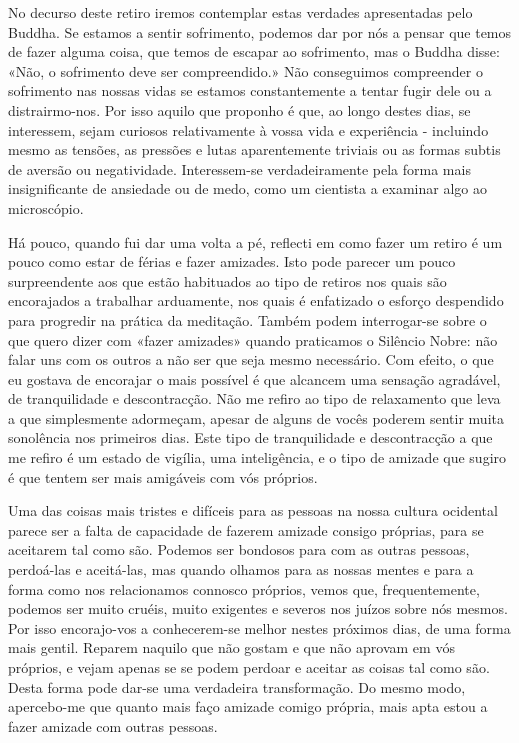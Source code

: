 No decurso deste retiro iremos contemplar estas verdades apresentadas
pelo Buddha. Se estamos a sentir sofrimento, podemos dar por nós a
pensar que temos de fazer alguma coisa, que temos de escapar ao
sofrimento, mas o Buddha disse: «Não, o sofrimento deve ser
compreendido.» Não conseguimos compreender o sofrimento nas nossas vidas
se estamos constantemente a tentar fugir dele ou a distrairmo-nos. Por
isso aquilo que proponho é que, ao longo destes dias, se interessem,
sejam curiosos relativamente à vossa vida e experiência - incluindo
mesmo as tensões, as pressões e lutas aparentemente triviais ou as
formas subtis de aversão ou negatividade. Interessem-se verdadeiramente
pela forma mais insignificante de ansiedade ou de medo, como um
cientista a examinar algo ao microscópio.

Há pouco, quando fui dar uma volta a pé, reflecti em como fazer um
retiro é um pouco como estar de férias e fazer amizades. Isto pode
parecer um pouco surpreendente aos que estão habituados ao tipo de
retiros nos quais são encorajados a trabalhar arduamente, nos quais é
enfatizado o esforço despendido para progredir na prática da meditação.
Também podem interrogar-se sobre o que quero dizer com «fazer amizades»
quando \mbox{praticamos} o Silêncio Nobre: não falar uns com os outros a não
ser que seja mesmo necessário. Com efeito, o que eu gostava de encorajar
o mais possível é que alcancem uma sensação agradável, de tranquilidade
e descontracção. Não me refiro ao tipo de relaxamento que leva a que
simplesmente adormeçam, apesar de alguns de vocês poderem sentir muita
sonolência nos primeiros dias. Este tipo de tranquilidade e
descontracção a que me refiro é um estado de vigília, uma inteligência,
e o tipo de amizade que sugiro é que tentem ser mais amigáveis com vós
próprios.

Uma das coisas mais tristes e difíceis para as pessoas na nossa cultura
ocidental parece ser a falta de capacidade de fazerem amizade consigo
próprias, para se aceitarem tal como são. Podemos ser bondosos para com
as outras pessoas, perdoá-las e aceitá-las, mas quando olhamos para as
nossas mentes e para a forma como nos relacionamos connosco próprios,
vemos que, frequentemente, podemos ser muito cruéis, muito exigentes e
severos nos juízos sobre nós mesmos. Por isso encorajo-vos a
conhecerem-se melhor nestes próximos dias, de uma forma mais gentil.
Reparem naquilo que não gostam e que não aprovam em vós próprios, e
vejam apenas se se podem perdoar e aceitar as coisas tal como são. Desta
forma pode dar-se uma verdadeira transformação. Do mesmo modo,
apercebo-me que quanto mais faço amizade comigo própria, mais apta estou
a fazer amizade com outras pessoas.

